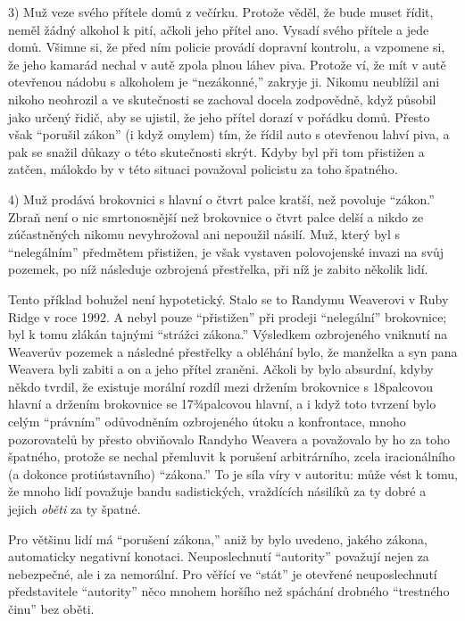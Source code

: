 \documentclass{book}
\begin{document}
3) Muž veze svého přítele domů z večírku. Protože věděl, že bude muset řídit, neměl žádný alkohol k pití, ačkoli jeho přítel ano. Vysadí svého přítele a jede domů. Všimne si, že před ním policie provádí dopravní kontrolu, a vzpomene si, že jeho kamarád nechal v autě zpola plnou láhev piva. Protože ví, že mít v autě otevřenou nádobu s alkoholem je \enquote{nezákonné,} zakryje ji. Nikomu neublížil ani nikoho neohrozil a ve skutečnosti se zachoval docela zodpovědně, když působil jako určený řidič, aby se ujistil, že jeho přítel dorazí v pořádku domů. Přesto však \enquote{porušil zákon} (i když omylem) tím, že řídil auto s otevřenou lahví piva, a pak se snažil důkazy o této skutečnosti skrýt. Kdyby byl při tom přistižen a zatčen, málokdo by v této situaci považoval policistu za toho špatného.

4) Muž prodává brokovnici s hlavní o čtvrt palce kratší, než povoluje \enquote{zákon.} Zbraň není o nic smrtonosnější než brokovnice o čtvrt palce delší a nikdo ze zúčastněných nikomu nevyhrožoval ani nepoužil násilí. Muž, který byl s \enquote{nelegálním} předmětem přistižen, je však vystaven polovojenské invazi na svůj pozemek, po níž následuje ozbrojená přestřelka, při níž je zabito několik lidí.

Tento příklad bohužel není hypotetický. Stalo se to Randymu Weaverovi v Ruby Ridge v roce 1992. A nebyl pouze \enquote{přistižen} při prodeji \enquote{nelegální} brokovnice; byl k tomu zlákán tajnými \enquote{strážci zákona.} Výsledkem ozbrojeného vniknutí na Weaverův pozemek a následné přestřelky a obléhání bylo, že manželka a syn pana Weavera byli zabiti a on a jeho přítel zraněni. Ačkoli by bylo absurdní, kdyby někdo tvrdil, že existuje morální rozdíl mezi držením brokovnice s 18palcovou hlavní a držením brokovnice se 17¾palcovou hlavní, a i když toto tvrzení bylo celým \enquote{právním} odůvodněním ozbrojeného útoku a konfrontace, mnoho pozorovatelů by přesto obviňovalo Randyho Weavera a považovalo by ho za toho špatného, protože se nechal přemluvit k porušení arbitrárního, zcela iracionálního (a dokonce protiústavního) \enquote{zákona.} To je síla víry v autoritu: může vést k tomu, že mnoho lidí považuje bandu sadistických, vraždících násilíků za ty dobré a jejich \emph{oběti} za ty špatné.

Pro většinu lidí má \enquote{porušení zákona,} aniž by bylo uvedeno, jakého zákona, automaticky negativní konotaci. Neuposlechnutí \enquote{autority} považují nejen za nebezpečné, ale i za nemorální. Pro věřící ve \enquote{stát} je otevřené neuposlechnutí představitele \enquote{autority} něco mnohem horšího než spáchání drobného \enquote{trestného činu} bez oběti.
\end{document}
